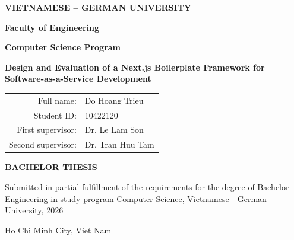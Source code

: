 \begin{center}

   \vspace*{1.5cm}
   {\Large\bfseries VIETNAMESE -- GERMAN UNIVERSITY}
   
   \vspace{0.7cm}
   {\large\bfseries Faculty of Engineering}
   
   \vspace{0.35cm}
   {\large\bfseries Computer Science Program}
   
   \vspace{3.6cm}
   {\Large\bfseries Design and Evaluation of a Next.js Boilerplate Framework for Software-as-a-Service Development}
   
   \vspace{2.65cm}
   {\large
   \begin{tabular}{r l}
   Full name: & Do Hoang Trieu \\[0.3cm]
   Student ID: & 10422120 \\[0.3cm]
   First supervisor: & Dr. Le Lam Son \\[0.3cm]
   Second supervisor: & Dr. Tran Huu Tam
   \end{tabular}
   }
   
   \vspace{2.39cm}
   {\large\bfseries BACHELOR THESIS}
   
   \vspace{0.91cm}
   Submitted in partial fulfillment of the requirements for the degree of Bachelor Engineering in study program Computer Science, Vietnamese - German University, 2026
   
   \vspace{1.62cm}
   Ho Chi Minh City, Viet Nam
   
   \end{center}